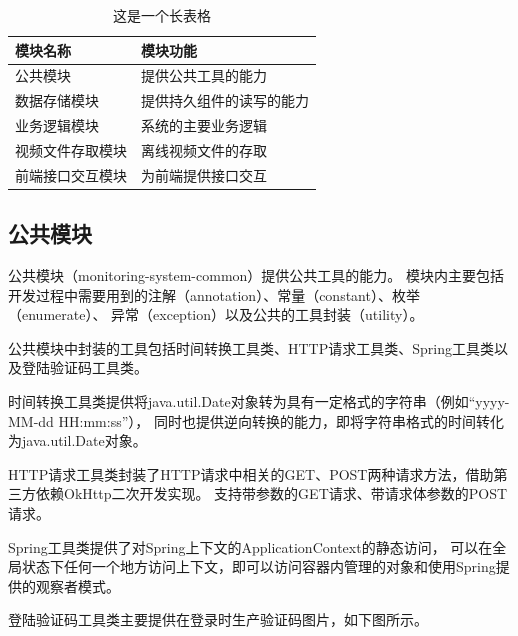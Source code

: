 \begin{longtable}[c]{C{5cm}C{7cm}}
    \caption{这是一个长表格}\label{Tab:longtable}\\
    \hline
    模块名称 & 模块功能\\

    \hline
    公共模块&提供公共工具的能力\\ %
    \hline
    数据存储模块&提供持久组件的读写的能力\\ %
    \hline
    业务逻辑模块&系统的主要业务逻辑\\ %
    \hline
    视频文件存取模块&离线视频文件的存取\\ %
    \hline
    前端接口交互模块&为前端提供接口交互\\ %
    \hline
\end{longtable}
\subsection{公共模块}
公共模块（monitoring-system-common）提供公共工具的能力。
模块内主要包括开发过程中需要用到的注解（annotation）、常量（constant）、枚举（enumerate）、
异常（exception）以及公共的工具封装（utility）。

公共模块中封装的工具包括时间转换工具类、HTTP请求工具类、Spring工具类以及登陆验证码工具类。

时间转换工具类提供将java.util.Date对象转为具有一定格式的字符串（例如“yyyy-MM-dd HH:mm:ss”），
同时也提供逆向转换的能力，即将字符串格式的时间转化为java.util.Date对象。

HTTP请求工具类封装了HTTP请求中相关的GET、POST两种请求方法，借助第三方依赖OkHttp二次开发实现。
支持带参数的GET请求、带请求体参数的POST请求。

Spring工具类提供了对Spring上下文的ApplicationContext的静态访问，
可以在全局状态下任何一个地方访问上下文，即可以访问容器内管理的对象和使用Spring提供的观察者模式。

登陆验证码工具类主要提供在登录时生产验证码图片，如下图所示。

